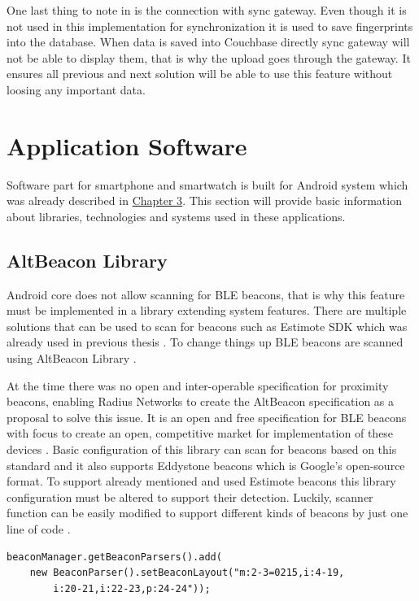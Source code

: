 One last thing to note in  is the connection with sync gateway. Even though it is not used in this implementation for synchronization it is used to save fingerprints into the database. When data is saved into Couchbase directly sync gateway will not be able to display them, that is why the upload goes through the gateway. It ensures all previous and next solution will be able to use this feature without loosing any important data.

\section{Application Software}\label{sec:ApplicationSoftware}
Software part for smartphone and smartwatch is built for Android system which was already described in \hyperref[sec:WearOS]{Chapter 3}. This section will provide basic information about libraries, technologies and systems used in these applications.

\subsection{AltBeacon Library}\label{subsec:AltBeaconLibrary}
Android core does not allow scanning for BLE beacons, that is why this feature must be implemented in a library extending system features. There are multiple solutions that can be used to scan for beacons such as Estimote SDK \cite{ESDKfA} which was already used in previous thesis \cite{PMRIL}. To change things up BLE beacons are scanned using AltBeacon Library \cite{ABL}.

At the time there was no open and inter-operable specification for proximity beacons, enabling Radius Networks to create the AltBeacon specification as a proposal to solve this issue. It is an open and free specification for BLE beacons with focus to create an open, competitive market for implementation of these devices \cite{AltB}. Basic configuration of this library can scan for beacons based on this standard and it also supports Eddystone beacons which is Google's open-source format. To support already mentioned and used Estimote beacons this library configuration must be altered to support their detection. Luckily, scanner function can be easily modified to support different kinds of beacons by just one line of code \cite{ABL, EDDF}.

\begin{lstlisting}[caption=Code to enable all beacon types]
beaconManager.getBeaconParsers().add(
	new BeaconParser().setBeaconLayout("m:2-3=0215,i:4-19,
		i:20-21,i:22-23,p:24-24"));
\end{lstlisting}

